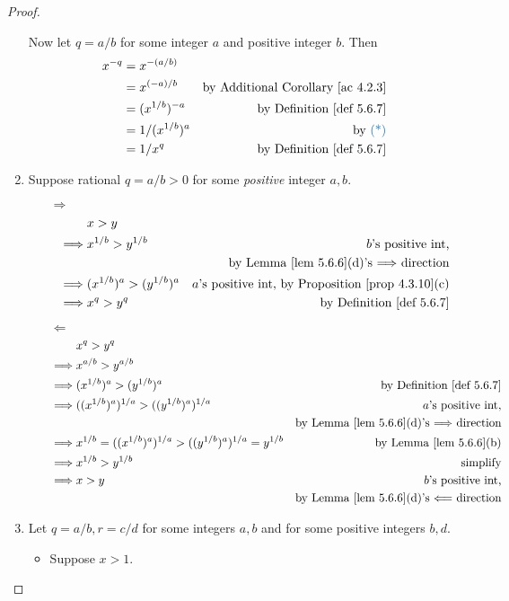 \begin{proof}
\begin{enumerate}
    Now let \(q = a/b\) for some integer \(a\) and positive integer \(b\).
    Then
    \begin{align*}
        x^{-q} & = x^{-(a/b)} \\
               & = x^{(-a)/b} & \text{by \AC{4.2.3}} \\
               & = (x^{1/b})^{-a} & \text{by \DEF{5.6.7}} \\
               & = 1/(x^{1/b})^{a} & \text{by \BLUE{(*)}} \\
               & = 1/x^q & \text{by \DEF{5.6.7}}
    \end{align*}
\item
    Suppose rational \(q = a/b > 0\) for some \emph{positive} integer \(a, b\).
    \begin{itemize}
    \item[\(\Longrightarrow\)]
        \begin{align*}
                     & x > y \\
            \implies & x^{1/b} > y^{1/b} & \text{\(b\)'s positive int,} \\
                     &                   & \text{by \LEM{5.6.6}(d)'s \(\Longrightarrow\) direction} \\
            \implies & (x^{1/b})^a > (y^{1/b})^a & \text{\(a\)'s positive int, by \PROP{4.3.10}(c)} \\
            \implies & x^q > y^q & \text{by \DEF{5.6.7}}
        \end{align*}
    \item[\(\Longleftarrow\)]
        \begin{align*}
                     & x^q > y^q \\
            \implies & x^{a/b} > y^{a/b} \\
            \implies & (x^{1/b})^a > (y^{1/b})^a & \text{by \DEF{5.6.7}} \\
            \implies & ((x^{1/b})^a)^{1/a} > ((y^{1/b})^a)^{1/a} & \text{\(a\)'s positive int,} \\
                     &                                           & \text{by \LEM{5.6.6}(d)'s \(\Longrightarrow\) direction} \\
            \implies & x^{1/b} = ((x^{1/b})^a)^{1/a} > ((y^{1/b})^a)^{1/a} = y^{1/b} & \text{by \LEM{5.6.6}(b)} \\
            \implies & x^{1/b} > y^{1/b} & \text{simplify} \\
            \implies & x > y & \text{\(b\)'s positive int,} \\
                     &       & \text{by \LEM{5.6.6}(d)'s \(\Longleftarrow\) direction}
        \end{align*}
    \end{itemize}
\item
    Let \(q = a/b, r = c/d\) for some integers \(a, b\) and for some positive integers \(b, d\).
    \begin{itemize}
    \item
        Suppose \(x > 1\).


\end{itemize}
\end{enumerate}
\end{proof}
